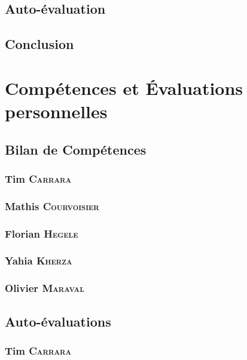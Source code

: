 \section{Auto-évaluation}



\section{Conclusion}


\appendix

\chapter{Compétences et Évaluations personnelles}

\section{Bilan de Compétences}

\subsection*{Tim \textsc{Carrara}}

\subsection*{Mathis \textsc{Courvoisier}}

\subsection*{Florian \textsc{Hegele}}

\subsection*{Yahia \textsc{Kherza}}

\subsection*{Olivier \textsc{Maraval}}


\section{Auto-évaluations}

\subsection*{Tim \textsc{Carrara}}

